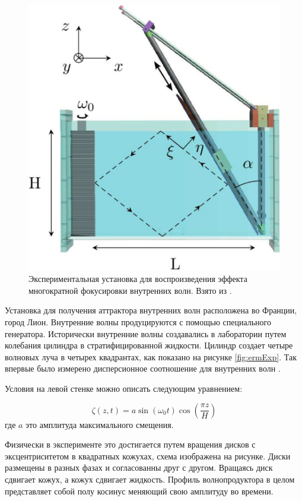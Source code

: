 \begin{figure}
    \centering
    \includegraphics[scale=0.6]{pics/SetupAttr.png}
    \caption{Экспериментальная установка для воспроизведения эффекта многократной фокусировки внутренних волн. Взято из \cite{Brouzet2016}.}
    \label{fig:attrSetup}
\end{figure}

Установка для получения аттрактора внутренних волн расположена во Франции, город Лион. Внутренние волны продуцируются с помощью специального генератора. Исторически внутренние волны создавались в лаборатории путем колебания цилиндра в стратифицированной жидкости. Цилиндр создает четыре волновых луча в четырех квадрантах, как показано на рисунке \ref{fig:ermExp}. Так впервые было измерено дисперсионное соотношение для внутренних волн \cite{Grtler1943, Mowbray1967}.

Условия на левой стенке можно описать следующим уравнением:

\begin{equation}
    \zeta (z,t) = a \sin (\omega_0 t) \cos \left( \frac{\pi z}{H} \right) 
    \label{eq:wmOsc}
\end{equation}
где $a$ это амплитуда максимального смещения. 

Физически в эксперименте это достигается путем вращения дисков с эксцентриситетом в квадратных кожухах, схема изображена на рисунке. Диски размещены в разных фазах и согласованны друг с другом. Вращаясь диск сдвигает кожух, а кожух сдвигает жидкость. Профиль волнопродуктора в целом представляет собой полу косинус меняющий свою амплитуду во времени.

